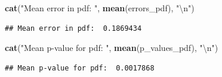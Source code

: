 \documentclass[a4paper]{article}
\newenvironment{Shaded}{\begin{snugshade}}{\end{snugshade}}
\newcommand{\CharTok}[1]{\textcolor[rgb]{0.31,0.60,0.02}{#1}}
\newcommand{\KeywordTok}[1]{\textcolor[rgb]{0.13,0.29,0.53}{\textbf{#1}}}
\newcommand{\NormalTok}[1]{#1}
\newcommand{\StringTok}[1]{\textcolor[rgb]{0.31,0.60,0.02}{#1}}
\begin{document}
\begin{enumerate}[a)]
\begin{Shaded}
\begin{Highlighting}[]
\KeywordTok{cat}\NormalTok{(}\StringTok{"Mean error in pdf: "}\NormalTok{, }\KeywordTok{mean}\NormalTok{(errors_pdf), }\StringTok{"}\CharTok{\textbackslash{}n}\StringTok{"}\NormalTok{)}
\end{Highlighting}
\end{Shaded}

\begin{verbatim}
## Mean error in pdf:  0.1869434
\end{verbatim}

\begin{Shaded}
\begin{Highlighting}[]
\KeywordTok{cat}\NormalTok{(}\StringTok{"Mean p-value for pdf: "}\NormalTok{, }\KeywordTok{mean}\NormalTok{(p_values_pdf), }\StringTok{"}\CharTok{\textbackslash{}n}\StringTok{"}\NormalTok{)}
\end{Highlighting}
\end{Shaded}

\begin{verbatim}
## Mean p-value for pdf:  0.0017868
\end{verbatim}


	
	
\end{enumerate}
\end{document}
